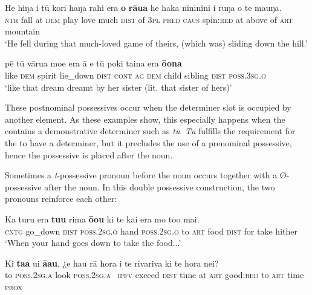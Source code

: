\ea\label{ex:6.12}
\gll He hiŋa {\ꞌ}i tū kori haŋa rahi era \textbf{o} \textbf{rāua} he haka nininini {\ꞌ}i ruŋa  o te ma{\ꞌ}uŋa.\\
\textsc{ntr} fall at \textsc{dem} play love much \textsc{dist} of \textsc{3pl} \textsc{pred} \textsc{caus} spin:\textsc{red} at above  of \textsc{art} mountain\\

\glt 
‘He fell during that much-loved game of theirs, (which was) sliding down the hill.’ \textstyleExampleref{[R313.103]} 
\z

\ea\label{ex:6.13}
\gll pē tū vārua moe era {\ꞌ}ā e tū poki taina era \textbf{ō{\ꞌ}ona} \\
like \textsc{dem} spirit lie\_down \textsc{dist} \textsc{cont} \textsc{ag} \textsc{dem} child sibling \textsc{dist} \textsc{poss.3sg.o} \\

\glt
‘like that dream dreamt by her sister (lit. that sister of hers)’ \textstyleExampleref{[R347.131]} 
\z

These postnominal possessives occur when the determiner slot is occupied by another element. As these examples show, this especially happens when the  contains a demonstrative determiner such as \textit{tū}. \textit{Tū} fulfills the requirement for the  to have a determiner, but it precludes the use of a prenominal possessive, hence the possessive is placed after the noun.

Sometimes a \textit{t}-possessive pronoun before the noun occurs together with a Ø-pos\-ses\-sive after the noun. In this double possessive construction, the two pronouns reinforce each other:

\ea\label{ex:6.14}
\gll Ka turu era \textbf{tu{\ꞌ}u} rima \textbf{ō{\ꞌ}ou} ki te kai era mo to{\ꞌ}o mai. \\
\textsc{cntg} go\_down \textsc{dist} \textsc{poss.2sg.o} hand \textsc{poss.2sg.o} to \textsc{art} food \textsc{dist} for take hither \\

\glt 
‘When your hand goes down to take the food...’ \textstyleExampleref{[R310.088]} 
\z

\ea\label{ex:6.15}
\gll Ki \textbf{ta{\ꞌ}a} u{\ꞌ}i \textbf{{\ꞌ}ā{\ꞌ}au}, ¿e hau rā hora {\ꞌ}i te rivariva ki te hora nei? \\
to \textsc{poss.2sg.a} look \textsc{poss.2sg.a} ~\textsc{ipfv} exceed \textsc{dist} time at \textsc{art} good:\textsc{red} to \textsc{art} time \textsc{prox} \\

